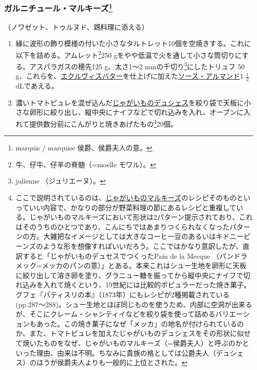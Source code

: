 \begin{recette}
\hypertarget{garniture-marquise}{%
\subsubsection[ガルニチュール・マルキーズ]{\texorpdfstring{ガルニチュール・マルキーズ\footnote{marquis
  / marquise 侯爵、侯爵夫人の意。}}{ガルニチュール・マルキーズ}}\label{garniture-marquise}}



（ノワゼット、トゥルヌド、鶏料理に添える）

\begin{enumerate}
\def\labelenumi{\arabic{enumi}.}
\item
  縁に波形の飾り模様の付いた小さなタルトレット10個を空焼きする。これに以下を詰める。アムレット\footnote{牛、仔牛、仔羊の脊髄（=moelle
    モワル）。}250
  gをやや低温で火を通して小さな筒切りにする。アスパラガスの穂先125
  g、太さ1〜2 mmの千切り\footnote{julienne （ジュリエーヌ）。}にしたトリュフ
  50
  g、これらを、\protect\hyperlink{beurre-d-ecrevisse}{エクルヴィスバター}を仕上げに加えた\protect\hyperlink{sauce-allemande}{ソース・アルマンド}1
  \(\frac{1}{2}\) dLであえる。
\item
  濃いトマトピュレを混ぜ込んだ\protect\hyperlink{pommes-de-terre-duchesse}{じゃがいものデュシェス}を絞り袋で天板に小さな卵形に絞り出し、縦中央にナイフなどで切れ込みを入れ、オーブンに入れて提供数分前にこんがりと焼きあげたもの\footnote{ここで説明されているのは、\protect\hyperlink{pommes-de-terre-marquise}{じゃがいものマルキーズ}のレシピそのものといっていい内容で、かなりの部分が野菜料理の節にあるレシピと重複している。じゃがいものマルキーズにおいて形状は2パターン提示されており、これはそのうちのひとつであり、こんにちではあまりつくられなくなったパターンの方。大雑把なイメージとしては大きなコーヒー豆のあるいはキドニービーンズのような形を想像すればいいだろう。ここではかなり意訳したが、直訳すると「じゃがいものデュセスでつくったPain
    de la Mecque
    （パンドラメック=メッカのパンの意）」とある。本来これはシュー生地を卵形に天板に絞り出して溶き卵を塗り、グラニュー糖を振ってから縦中央にナイフで切れ込みを入れて焼くという、19世紀には比較的ポピュラーだった焼き菓子。グフェ『パティスリの本』（1873年）にもレシピが2種掲載されている
    (pp.287〜288)。シュー生地とほぼ同じものを使うため、内部に空洞が出来るが、そこにクレーム・シャンティイなどを絞り袋を使って詰めるバリエーションもあった。この焼き菓子になぜ「メッカ」の地名が付けられているのか、また、トマトピュレを加えたじゃがいものデュシェスをその形状に似せて焼いたものをなぜ、じゃがいものマルキーズ（=侯爵夫人）と呼ぶのかといった理由、由来は不明。ちなみに貴族の格としては公爵夫人（デュシェス）のほうが侯爵夫人よりも一般的に上位とされた。}20個。
\end{enumerate}


\end{recette}
